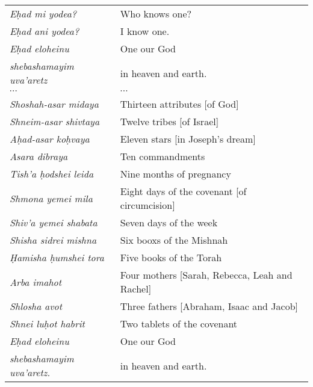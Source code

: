 \documentclass[a4paper,10pt,openany]{memoir}
\begin{document}
{
  \small

\noindent
\begin{tabular}{@{}ll}
  \itshape E\d{h}ad mi yodea? & Who knows one? \\
  \itshape E\d{h}ad ani yodea? & I know one. \\
  \itshape E\d{h}ad eloheinu & One our God \\
  \itshape shebashamayim uva'aretz & in heaven and earth. \\
  \itshape $\cdots$ & $\cdots$ \\
  \itshape Shoshah-asar midaya & Thirteen attributes [of God] \\
  \itshape Shneim-asar shivtaya & Twelve tribes [of Israel] \\
  \itshape A\d{h}ad-asar ko\d{h}vaya & Eleven stars [in Joseph's dream] \\
  \itshape Asara dibraya & Ten commandments \\
  \itshape Tish'a \d{h}odshei leida & Nine months of pregnancy\\
  \itshape Shmona yemei mila & Eight days of the covenant [of circumcision] \\
  \itshape Shiv'a yemei shabata & Seven days of the week \\
  \itshape Shisha sidrei mishna & Six booxs of the Mishnah \\
  \itshape \d{H}amisha \d{h}umshei tora & Five books of the Torah \\
  \itshape Arba imahot & Four mothers [Sarah, Rebecca, Leah and Rachel] \\
  \itshape Shlosha avot & Three fathers [Abraham, Isaac and Jacob] \\
  \itshape Shnei lu\d{h}ot habrit & Two tablets of the covenant \\
  \itshape E\d{h}ad eloheinu & One our God \\
  \itshape shebashamayim uva'aretz. & in heaven and earth.
\end{tabular}

\vspace{2em}

}
\end{document}
